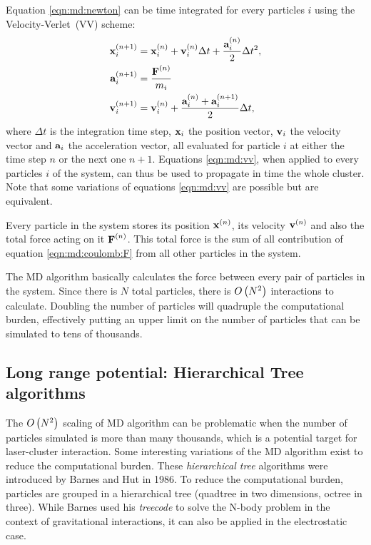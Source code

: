 Equation \eqref{eqn:md:newton} can be time integrated for every particles
$i$ using the Velocity-Verlet~(VV) scheme:
\begin{subequations}
\begin{align}
\textbf{x}_{i}^{\left( n+1 \right)} & = \textbf{x}_{i}^{\left( n \right)} + \textbf{v}_{i}^{\left( n \right)} \Delta t +
\frac{\textbf{a}_{i}^{\left( n \right)}}{2} \Delta t^2, \\
\textbf{a}_{i}^{\left( n+1 \right)} & = \frac{\textbf{F}^{\left( n \right)}}{m_i} \label{eqn:md:vv:a} \\
\textbf{v}_{i}^{\left( n+1 \right)} & = \textbf{v}_{i}^{\left( n \right)} + \frac{\textbf{a}_{i}^{\left( n \right)} +
\textbf{a}_{i}^{\left( n+1 \right)}}{2} \Delta t,
\end{align}
\label{eqn:md:vv}
\end{subequations}
where $\Delta t$ is the integration time step, $\textbf{x}_{i}$ the position vector,
$\textbf{v}_{i}$ the velocity vector and $\textbf{a}_{i}$ the acceleration vector, all evaluated
for particle $i$ at either the time step $n$ or the next one $n+1$.
Equations \eqref{eqn:md:vv}, when applied to every particles $i$ of the system,
can thus be used to propagate in time the whole cluster. Note that some
variations of equations \eqref{eqn:md:vv} are possible but are equivalent.

Every particle in the system stores its position $\textbf{x}^{\left( n \right)}$, its velocity
$\textbf{v}^{\left( n \right)}$ and also the total force acting on it $\textbf{F}^{\left( n \right)}$. This total
force is the sum of all contribution of equation \eqref{eqn:md:coulomb:F} from
all other particles in the system.

The MD algorithm basically calculates the force between every pair of particles
in the system. Since there is $N$ total particles, there is $O\left( N^2 \right)$
interactions to calculate. Doubling the number of particles will quadruple the
computational burden, effectively putting an upper limit on the number of
particles that can be simulated to tens of thousands.

\subsection{Long range potential: Hierarchical Tree algorithms}
The $O\left( N^2 \right)$ scaling of MD algorithm can be problematic when the number of
particles simulated is more than many thousands, which is a potential target
for laser-cluster interaction. Some interesting variations of the MD algorithm
exist to reduce the computational burden. These \textit{hierarchical tree}
algorithms were introduced\cite{Barnes1986} by Barnes and Hut in 1986. To
reduce the computational burden, particles are grouped in a hierarchical tree
(quadtree in two dimensions, octree in three). While Barnes used his
\textit{treecode} to solve the N-body problem in the context of gravitational
interactions, it can also be applied in the electrostatic case.

